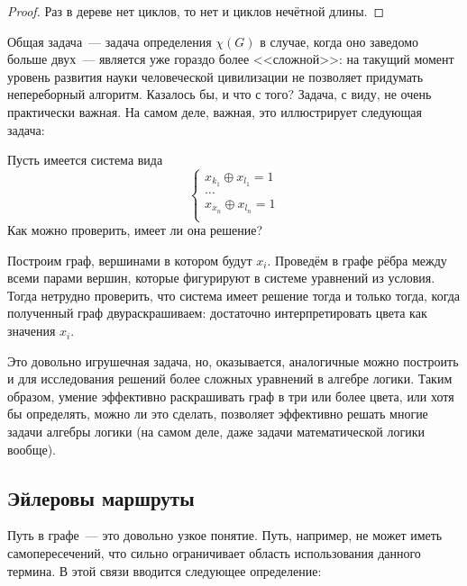 \begin{proof}
    Раз в дереве нет циклов, то нет и циклов нечётной длины.
\end{proof}

Общая задача~--- задача определения $ \chi(G) $ в случае, когда оно заведомо больше двух~--- является уже гораздо более <<сложной>>:
на такущий момент уровень развития науки человеческой цивилизации не позволяет придумать непереборный алгоритм.
Казалось бы, и что с того?
Задача, с виду, не очень практически важная.
На самом деле, важная, это иллюстрирует следующая задача:

\begin{Exercise}[counter=SecExercise]
    \noindent
    Пусть имеется система вида
    \[
        \begin{cases}
            x_{k_1} \oplus x_{l_1} = 1 \\
            \ldots \\
            x_{x_n} \oplus x_{l_n} = 1 \\
        \end{cases}
    \]
    Как можно проверить, имеет ли она решение?
\end{Exercise}

\begin{Answer}
    \noindent
    Построим граф, вершинами в котором будут $ x_i $.
    Проведём в графе рёбра между всеми парами вершин, которые фигурируют в системе уравнений из условия.
    Тогда нетрудно проверить, что система имеет решение тогда и только тогда, когда полученный граф двураскрашиваем:
    достаточно интерпретировать цвета как значения $ x_i $.
\end{Answer}

Это довольно игрушечная задача, но, оказывается, аналогичные  можно построить и для исследования решений более сложных уравнений в алгебре логики.
Таким образом, умение эффективно раскрашивать граф в три или более цвета, или хотя бы определять, можно ли это сделать, позволяет эффективно решать многие задачи алгебры логики
(на самом деле, даже задачи математической логики вообще).



\subsection{Эйлеровы маршруты}
\label{subsec:graphs:Euler_walks}

Путь в графе~--- это довольно узкое понятие.
Путь, например, не может иметь самопересечений, что сильно ограничивает область использования данного термина.
В этой связи вводится следующее определение:

